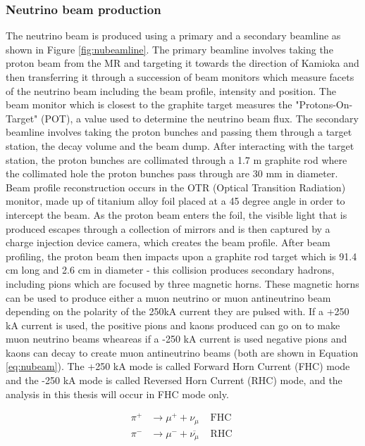 \subsubsection{Neutrino beam production}

The neutrino beam is produced using a primary and a secondary beamline as shown in Figure \ref{fig:nubeamline}. The primary beamline involves taking the proton beam from the MR and targeting it towards the direction of Kamioka and then transferring it through a succession of beam monitors which measure facets of the neutrino beam including the beam profile, intensity and position. The beam monitor which is closest to the graphite target measures the "Protons-On-Target" (POT), a value used to determine the neutrino beam flux. The secondary beamline involves taking the proton bunches and passing them through a target station, the decay volume and the beam dump. After interacting with the target station, the proton bunches are collimated through a 1.7 m graphite rod where the collimated hole the proton bunches pass through are 30 mm in diameter. Beam profile reconstruction occurs in the OTR (Optical Transition Radiation) monitor, made up of titanium alloy foil placed at a 45 degree angle in order to intercept the beam. As the proton beam enters the foil, the visible light that is produced escapes through a collection of mirrors and is then captured by a charge injection device camera, which creates the beam profile. After beam profiling, the proton beam then impacts upon a graphite rod target which is 91.4 cm long and 2.6 cm in diameter - this collision produces secondary hadrons, including pions which are focused by three magnetic horns. These magnetic horns can be used to produce either a muon neutrino or muon antineutrino beam depending on the polarity of the 250kA current they are pulsed with. If a +250 kA current is used, the positive pions and kaons produced can go on to make muon neutrino beams wheareas if a -250 kA current is used negative pions and kaons can decay to create muon antineutrino beams (both are shown in Equation \ref{eq:nubeam}). The +250 kA mode is called Forward Horn Current (FHC) mode and the -250 kA mode is called Reversed Horn Current (RHC) mode, and the analysis in this thesis will occur in FHC mode only. 

\begin{equation}
\begin{array}{lll}
\pi^{+} & \longrightarrow \mu^{+}+\nu_{\mu} & \text { FHC } \\
\pi^{-} & \longrightarrow \mu^{-}+\overline{\nu_{\mu}} & \text { RHC }
\end{array}
\label{eq:nubeam}
\end{equation}

